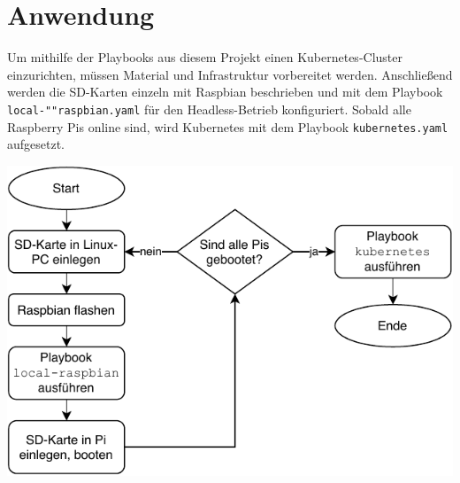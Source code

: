 \chapter{Anwendung}\label{ch:anwendung}

Um mithilfe der Playbooks aus diesem Projekt einen Kubernetes-Cluster einzurichten, müssen Material und Infrastruktur vorbereitet werden.
Anschließend werden die SD-Karten einzeln mit Raspbian beschrieben und mit dem Playbook \texttt{local-""raspbian.yaml} für den Headless-Betrieb konfiguriert.
Sobald alle Raspberry Pis online sind, wird Kubernetes mit dem Playbook \texttt{kubernetes.yaml} aufgesetzt.

\includegraphics[width=.7\textwidth]{img/anwendung.pdf}

